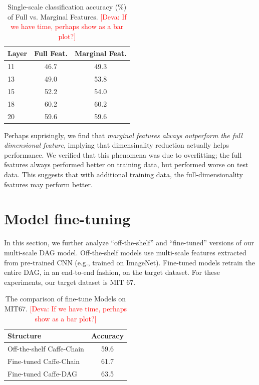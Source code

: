 \documentclass[10pt,twocolumn,letterpaper]{article}
\newcommand{\deva}[1]{\textcolor{red}{[Deva: #1]}}
\begin{document}
\begin{table}[htbp]
\begin{center}
\begin{tabular}{|l|c|c|}
\hline
Layer & Full Feat. & Marginal Feat. \\
\hline
11 & 46.7 & 49.3  \\
13 & 49.0 & 53.8  \\
15 & 52.2 & 54.0  \\
18 & 60.2 & 60.2  \\
20 & 59.6 & 59.6  \\

\hline
\end{tabular}
\end{center}
\caption{Single-scale classification accuracy (\%) of Full vs. Marginal Features. \deva{If we have time, perhaps show as a bar plot?}}
\label{table:perf_full}
\end{table}

 Perhaps suprisingly, we find that {\em marginal features always outperform the full dimensional feature}, implying that dimensinality reduction actually helps performance. We verified that this phenomena was due to overfitting; the full features always performed better on training data, but performed worse on test data. This suggests that with additional training data, the full-dimensionality features may perform better.

\section{Model fine-tuning}

In this section, we further analyze ``off-the-shelf'' and ``fine-tuned'' versions of our multi-scale DAG model. Off-the-shelf models use multi-scale features extracted from pre-trained CNN (e.g., trained on ImageNet). Fine-tuned models retrain the entire DAG, in an end-to-end fashion, on the target dataset. For these experiments, our target dataset is MIT 67. 

\begin{table}[htbp]
\begin{center}
\begin{tabular}{|l|c|}
\hline
Structure & Accuracy \\
\hline
Off-the-shelf Caffe-Chain & 59.6   \\
Fine-tuned Caffe-Chain & 61.7 \\
Fine-tuned Caffe-DAG & 63.5\\
\hline
\end{tabular}
\end{center}
\caption{The comparison of fine-tune Models on MIT67. \deva{If we have time, perhaps show as a bar plot?}}
\label{table:ft_models}
\end{table}
\end{document}
